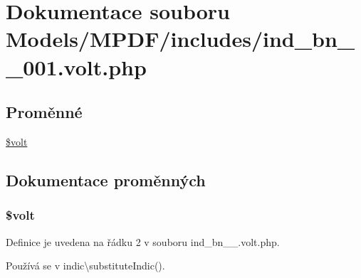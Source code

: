 \hypertarget{ind__bn__1__001_8volt_8php}{\section{Dokumentace souboru Models/\-M\-P\-D\-F/includes/ind\-\_\-bn\-\_\-\_\-001.volt.\-php}
\label{ind__bn__1__001_8volt_8php}
}
\subsection*{Proměnné}
\begin{DoxyCompactItemize}
\item 
\hyperlink{ind__bn__1__001_8volt_8php_a013d9bcd621d002433e25a82dd593989}{\$volt}
\end{DoxyCompactItemize}


\subsection{Dokumentace proměnných}
\hypertarget{ind__bn__1__001_8volt_8php_a013d9bcd621d002433e25a82dd593989}{
\subsubsection[{\$volt}]{\setlength{\rightskip}{0pt plus 5cm}\$volt}}\label{ind__bn__1__001_8volt_8php_a013d9bcd621d002433e25a82dd593989}


Definice je uvedena na řádku 2 v souboru ind\-\_\-bn\-\_\-\_.\-volt.\-php.



Používá se v indic\textbackslash{}substitute\-Indic().

